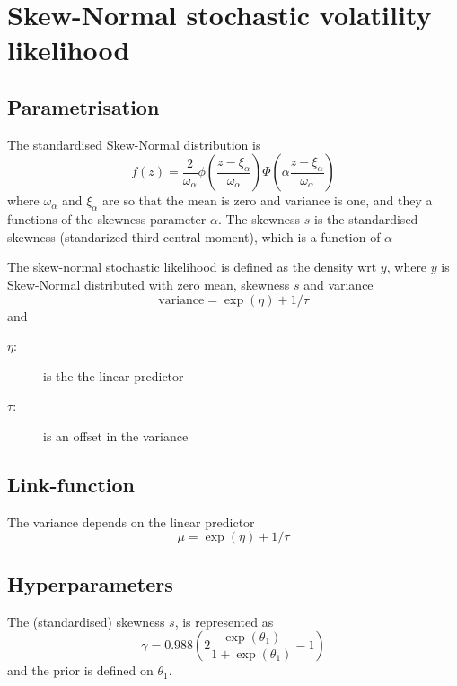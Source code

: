 \documentclass[a4paper,11pt]{article}
\begin{document}
\section*{Skew-Normal stochastic volatility likelihood}

\subsection*{Parametrisation}

The standardised Skew-Normal distribution is
\begin{displaymath}
    f(z) = \frac{2}{\omega_{\alpha}}
    \phi\left(\frac{z -\xi_{\alpha}}{\omega_{\alpha}}\right)
    \Phi\left(\alpha \frac{z -\xi_{\alpha}}{\omega_{\alpha}}\right)
\end{displaymath}
where $\omega_\alpha$ and $\xi_\alpha$ are so that the mean is zero
and variance is one, and they a functions of the skewness parameter
$\alpha$. The skewness $s$ is the standardised skewness (standarized
third central moment), which is a function of $\alpha$

The skew-normal stochastic likelihood is defined as the density wrt
$y$, where $y$ is Skew-Normal distributed with zero mean, skewness $s$
and variance
\begin{displaymath}
    \text{variance} = \exp(\eta) + 1/\tau
\end{displaymath}
and
\begin{description}
\item[$\eta$:] is the the linear predictor
\item[$\tau$:] is an offset in the variance
\end{description}

\subsection*{Link-function}

The variance depends on the linear predictor
\begin{displaymath}
    \mu = \exp(\eta) + 1/\tau
\end{displaymath}

\subsection*{Hyperparameters}

The (standardised) skewness $s$, is represented as
\begin{displaymath}
    \gamma=0.988 (2\frac{\exp(\theta_1)}{1+\exp(\theta_1)}-1)
\end{displaymath}
and the prior is defined on $\theta_{1}$.
\end{document}
